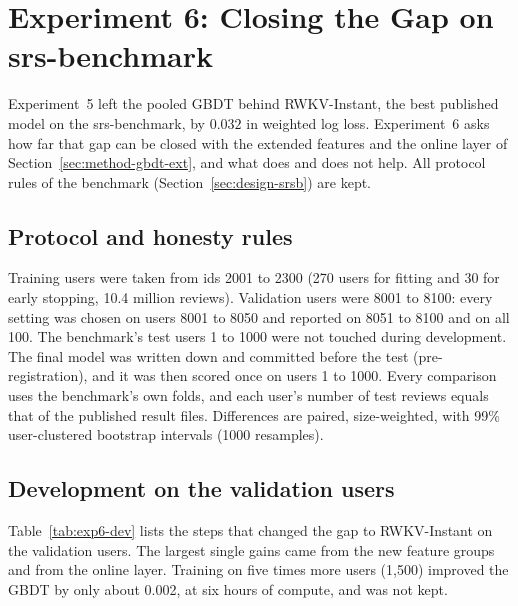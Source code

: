 \section{Experiment 6: Closing the Gap on srs-benchmark}
\label{sec:results-exp6}

Experiment~5 left the pooled GBDT behind RWKV-Instant, the best published model on the srs-benchmark, by $0.032$ in weighted
log loss. Experiment~6 asks how far that gap can be closed with the extended features and the online layer of
Section~\ref{sec:method-gbdt-ext}, and what does and does not help. All protocol rules of the benchmark
(Section~\ref{sec:design-srsb}) are kept.

\subsection{Protocol and honesty rules}
\label{sec:results-exp6-protocol}

Training users were taken from ids 2001 to 2300 (270 users for fitting and 30 for early stopping, 10.4 million reviews).
Validation users were 8001 to 8100: every setting was chosen on users 8001 to 8050 and reported on 8051 to 8100 and on all
100. The benchmark's test users 1 to 1000 were not touched during development. The final model was written down and
committed before the test (pre-registration), and it was then scored once on users 1 to 1000. Every comparison uses the
benchmark's own folds, and each user's number of test reviews equals that of the published result files. Differences are
paired, size-weighted, with 99\% user-clustered bootstrap intervals (1000 resamples).

\subsection{Development on the validation users}
\label{sec:results-exp6-dev}

Table~\ref{tab:exp6-dev} lists the steps that changed the gap to RWKV-Instant on the validation users. The largest single gains
came from the new feature groups and from the online layer. Training on five times more users (1,500) improved the GBDT by
only about 0.002, at six hours of compute, and was not kept.

